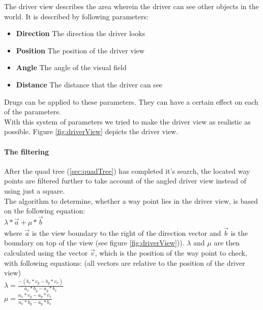 The driver view describes the area wherein the driver can see other objects in
the world. It is described by following parameters:

\begin{itemize}
\item \textbf{Direction} The direction the driver looks
\item \textbf{Position} The position of the driver view 
\item \textbf{Angle} The angle of the visual field
\item \textbf{Distance} The distance that the driver can see
\end{itemize}

\noindent Drugs can be applied to these parameters. They can have a certain effect
on each of the parameters. \\

\noindent With this system of parameters we tried to make the driver view as realistic
as possible. Figure \ref{fig:driverView} depicts the driver view.

\paragraph{The filtering}

After the quad tree (\ref{sec:quadTree}) has completed it's search, the located way
points are filtered further to take account of the angled driver view instead
of using just a square. \\

\noindent The algorithm to determine, whether a way point lies in the driver 
view, is based on the following equation: \\

$
\lambda * \vec{a} + \mu * \vec{b}
$ \\

\noindent where $\vec{a}$ is the view boundary to the right of the direction 
vector and $\vec{b}$ is the boundary on top of the view (see figure 
\ref{fig:driverView})). $\lambda$ and $\mu$ are then calculated using the 
vector $\vec{v}$, which is the position of the way point to check, with following
equations: (all vectors are relative to the position of the driver view) \\

$ \lambda = \frac{-(b_x*v_y - b_y * v_x)}{a_x * b_y - a_y * b_x}$\\

$\mu = \frac{a_x * v_y - a_y * v_x}{a_x * b_y - a_y * b_x} $ \\


